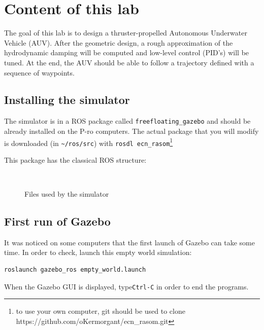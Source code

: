 \documentclass{ecnreport}
\begin{document}


\section{Content of this lab}

The goal of this lab is to design a thruster-propelled Autonomous Underwater Vehicle (AUV). After the geometric design, a rough approximation of the hydrodynamic damping will be computed
and low-level control (PID's) will be tuned. At the end, the AUV should be able to follow a trajectory defined with a sequence of waypoints.

\subsection{Installing the simulator}

The simulator is in a ROS package called \texttt{freefloating\_gazebo} and should be already installed on the P-ro computers.
The actual package that you will modify is downloaded (in \texttt{\~{}/ros/src}) with \texttt{rosdl ecn\_rasom}\footnote{to use your own computer, git should be used to clone https://github.com/oKermorgant/ecn\_rasom.git}

This package has the classical ROS structure:
\begin{figure}[h]
\begin{minipage}{.25\linewidth} ~ \end{minipage}
\begin{minipage}{.5\linewidth}
\end{minipage}
\caption{Files used by the simulator}
\end{figure}

\subsection{First run of Gazebo}

It was noticed on some computers that the first launch of Gazebo can take some time. In order to check, launch this empty world simulation:
\begin{center}
\begin{lstlisting}
roslaunch gazebo_ros empty_world.launch
  \end{lstlisting}
  \end{center}
  When the Gazebo GUI is displayed, type\texttt{Ctrl-C} in order to end the programs.
\end{document}
